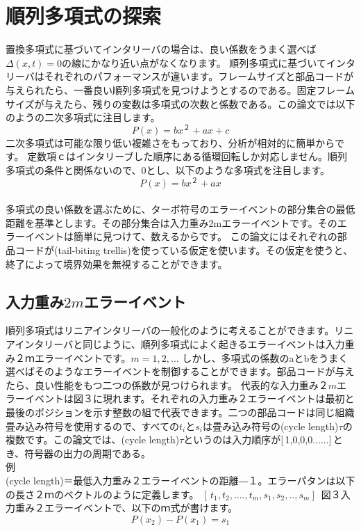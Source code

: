 \documentclass[20 pts]{article}
\begin{document}
\section{順列多項式の探索}
置換多項式に基づいてインタリーバの場合は、良い係数をうまく選べば$\Delta(x,t)=0$の線にかなり近い点がなくなります。
順列多項式に基づいてインタリーバはそれぞれのパフォーマンスが違います。フレームサイズと部品コードが与えられたら、一番良い順列多項式を見つけようとするのである。固定フレームサイズが与えたら、残りの変数は多項式の次数と係数である。この論文では以下のようの二次多項式に注目します。
$$P(x)= bx^２+ax+c$$二次多項式は可能な限り低い複雑さをもっており、分析が相対的に簡単からです。
定数項ｃはインタリーブした順序にある循環回転しか対応しません。順列多項式の条件と関係ないので、0とし、以下のような多項式を注目します。
$$P(x)= bx^２+ax$$
\paragraph{}
多項式の良い係数を選ぶために、ターボ符号のエラーイベントの部分集合の最低距離を基準とします。その部分集合は入力重み2mエラーイベントです。そのエラーイベントは簡単に見つけて、数えるからです。
この論文にはそれぞれの部品コードが(tail-biting trellis)を使っている仮定を使います。その仮定を使うと、終了によって境界効果を無視することができます。

\subsection{入力重み$2m$エラーイベント}
順列多項式はリニアインタリーバの一般化のように考えることができます。リニアインタリーバと同じように、順列多項式によく起きるエラーイベントは入力重み２ｍエラーイベントです。$m=1,2,...$
しかし、多項式の係数のaとbをうまく選べばそのようなエラーイベントを制御することができます。部品コードが与えたら、良い性能をもつ二つの係数が見つけられます。
代表的な入力重み$２m$エラーイベントは図３に現れます。それぞれの入力重み２エラーイベントは最初と最後のポジションを示す整数の組で代表できます。二つの部品コードは同じ組織畳み込み符号を使用するので、すべての$t_i$と$s_i$は畳み込み符号の(cycle length)$\tau$の複数です。この論文では、(cycle length)$\tau$というのは入力順序が[\,1,0,0,0......]\,とき、符号器の出力の周期である。\\例\\
 (cycle length)＝最低入力重み２エラーイベントの距離―１。エラーパタンは以下の長さ２ｍのベクトルのように定義します。
$[\,t_1, t_2,...., t_m, s_1,s_2,.., s_m]\,$
図３入力重み２エラーイベントで、以下のｍ式が書けます。
\begin{equation}\tag{3.1}
P(x_2)-P(x_1)=s_1
\end{equation}
\end{document}
